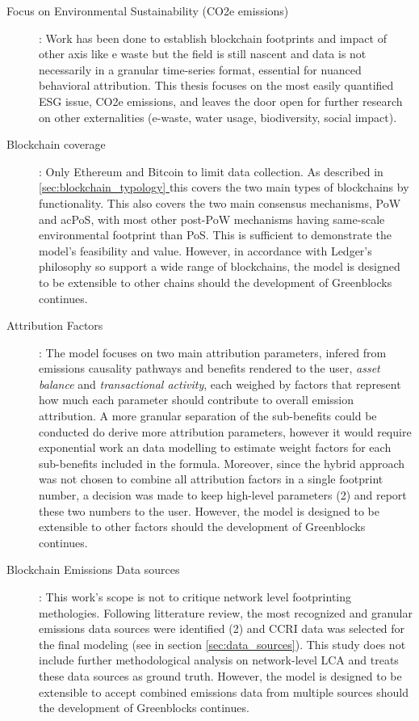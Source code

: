 \documentclass[11pt]{report}
\newcommand*{\fullref}[1]{\hyperref[{#1}]{\autoref*{#1} \nameref*{#1}}}
\begin{document}
\begin{description}
    \item [Focus on Environmental Sustainability (CO2e emissions)]: Work has been done to establish blockchain footprints and impact of other axis like e waste \cite{devriesBitcoinGrowingEwaste2021} but the field is still nascent and data is not necessarily in a granular time-series format, essential for nuanced behavioral attribution. This thesis focuses on the most easily quantified \ac{ESG} issue, CO2e emissions, and leaves the door open for further research on other externalities (e-waste, water usage, biodiversity, social impact).
    \item [Blockchain coverage]: Only Ethereum and Bitcoin to limit data collection. As described in \fullref{sec:blockchain_typology} this covers the two main types of blockchains by functionality. This also covers the two main consensus mechanisms, \ac{PoW} and ac{PoS}, with most other post-PoW mechanisms having same-scale environmental footprint than PoS. This is sufficient to demonstrate the model's feasibility and value. However, in accordance with Ledger's philosophy so support a wide range of blockchains, the model is designed to be extensible to other chains should the development of Greenblocks continues.
    \item [Attribution Factors]: The model focuses on two main attribution parameters, infered from emissions causality pathways and benefits rendered to the user, \textit{asset balance} and \textit{transactional activity}, each weighed by factors that represent how much each parameter should contribute to overall emission attribution. A more granular separation of the sub-benefits could be conducted do derive more attribution parameters, however it would require exponential work an data modelling to estimate weight factors for each sub-benefits included in the formula. Moreover, since the hybrid approach was not chosen to combine all attribution factors in a single footprint number, a decision was made to keep high-level parameters (2)  and report these two numbers to the user. However, the model is designed to be extensible to other factors should the development of Greenblocks continues.
    \item [Blockchain Emissions Data sources]: This work's scope is not to critique network level footprinting methologies. Following litterature review, the most recognized and granular emissions data sources were identified (2) and \ac{CCRI} data was selected for the final modeling (see in section \ref{sec:data_sources}). This study does not include further methodological analysis on network-level LCA and treats these data sources as ground truth. However, the model is designed to be extensible to accept combined emissions data from multiple sources should the development of Greenblocks continues.

\end{description}
\end{document}
